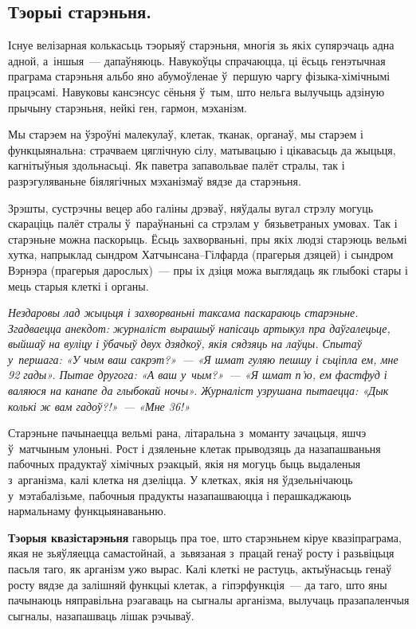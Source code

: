 \subsection*{Тэорыі старэньня.} 

Існуе велізарная колькасьць тэорыяў старэньня, многія зь якіх супярэчаць адна адной, а~іншыя~--- дапаўняюць. Навукоўцы спрачаюцца, ці ёсьць генэтычная праграма старэньня альбо яно абумоўленае ў~першую чаргу фізыка-хімічнымі працэсамі. Навуковы кансэнсус сёньня ў~тым, што нельга вылучыць адзіную прычыну старэньня, нейкі ген, гармон, мэханізм. 


Мы старэем на ўзроўні малекулаў, клетак, тканак, органаў, мы старэем і функцыянальна: страчваем цяглічную сілу, матывацыю і цікавасьць да жыцьця, кагнітыўныя здольнасьці. Як паветра запавольвае палёт стралы, так і разрэгуляваньне біялягічных мэханізмаў вядзе да старэньня.

Зрэшты, сустрэчны вецер або галіны дрэваў, няўдалы вугал стрэлу могуць скараціць палёт стралы ў~параўнаньні са стрэлам у~бязьветраных умовах. Так і старэньне можна паскорыць. Ёсьць захворваньні, пры якіх людзі старэюць вельмі хутка, напрыклад сындром Хатчынсана--Гілфарда (прагерыя дзяцей) і сындром Вэрнэра (прагерыя дарослых)~--- пры іх дзіця можа выглядаць як глыбокі стары і мець старыя клеткі і органы.

\emph{Нездаровы лад жыцьця і захворваньні таксама паскараюць старэньне. Згадваецца анекдот: журналіст вырашыў напісаць артыкул пра даўгалецьце, выйшаў на вуліцу і ўбачыў двух дзядкоў, якія сядзяць на лаўцы. Спытаў у~першага: «У чым ваш сакрэт?»~--- «Я шмат гуляю пешшу і сьціпла ем, мне 92 гады». Пытае другога: «А ваш у~чым?»~--- «Я шмат п'ю, ем фастфуд і валяюся на канапе да глыбокай ночы». Журналіст узрушана пытаецца: «Дык колькі ж вам гадоў?!»~--- «Мне 36!»}

Старэньне пачынаецца вельмі рана, літаральна з~моманту зачацьця, яшчэ ў~матчыным улоньні. Рост і дзяленьне клетак прыводзяць да назапашваньня пабочных прадуктаў хімічных рэакцый, якія ня могуць быць выдаленыя з~арганізма, калі клетка ня дзеліцца. У клетках, якія ня ўдзельнічаюць у~мэтабалізьме, пабочныя прадукты назапашваюцца і перашкаджаюць нармальнаму функцыянаваньню.

\textbf{Тэорыя квазістарэньня} гаворыць пра тое, што старэньнем кіруе квазіпраграма, якая не зьяўляецца самастойнай, а~зьвязаная з~працай генаў росту і разьвіцьця пасьля таго, як арганізм ужо вырас. Калі клеткі не растуць, актыўнасьць генаў росту вядзе да залішняй функцыі клетак, а~гіпэрфункція~--- да таго, што яны пачынаюць няправільна рэагаваць на сыгналы арганізма, вылучаць празапаленчыя сыгналы, назапашваць лішак рэчываў.

